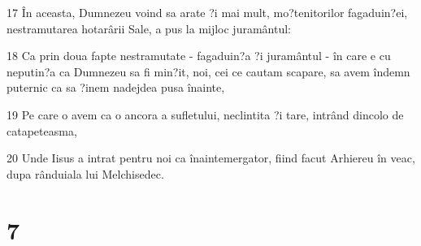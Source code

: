 \par 17 În aceasta, Dumnezeu voind sa arate ?i mai mult, mo?tenitorilor fagaduin?ei, nestramutarea hotarârii Sale, a pus la mijloc juramântul:
\par 18 Ca prin doua fapte nestramutate - fagaduin?a ?i juramântul - în care e cu neputin?a ca Dumnezeu sa fi min?it, noi, cei ce cautam scapare, sa avem îndemn puternic ca sa ?inem nadejdea pusa înainte,
\par 19 Pe care o avem ca o ancora a sufletului, neclintita ?i tare, intrând dincolo de catapeteasma,
\par 20 Unde Iisus a intrat pentru noi ca înaintemergator, fiind facut Arhiereu în veac, dupa rânduiala lui Melchisedec.

\chapter{7}

